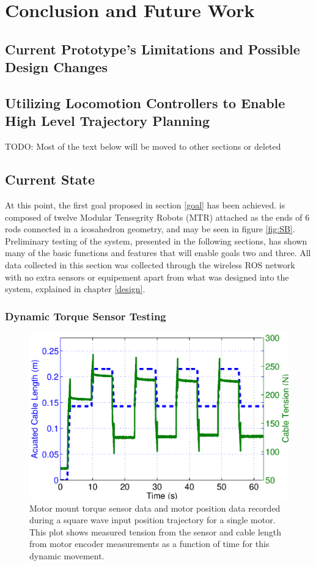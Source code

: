 \chapter{Conclusion and Future Work}
\label{conclusion}

\color{red}
\section{Current Prototype's Limitations and Possible Design Changes}

\section{Utilizing Locomotion Controllers to Enable High Level Trajectory Planning}


\color{blue}
TODO: Most of the text below will be moved to other sections or deleted 

\section{\SB{} Current State}
At this point, the first goal proposed in section \ref{goal} has been achieved.
\SB{} is composed of twelve Modular Tensegrity Robots (MTR) attached as the ends of 6 rods connected in a icosahedron geometry, and may be seen in figure \ref{fig:SB}.
Preliminary testing of the system, presented in the following sections, has shown many of the basic functions and features that will enable goals two and three.
All data collected in this section was collected through the wireless ROS network with no extra sensors or equipement apart from what was designed into the system, explained in chapter \ref{design}. 

\subsection{Dynamic Torque Sensor Testing}
\begin{figure}[thpb]
      \centering
      \includegraphics[width=0.8\columnwidth]{tex/img/ICRA2015_dynamic_sensor_test}
      \caption{Motor mount torque sensor data and motor position data recorded during a square wave input position trajectory for a single motor. This plot shows measured tension from the sensor and cable length from motor encoder measurements as a function of time for this dynamic movement.}
      \label{fig:sensor1data}
\end{figure}

